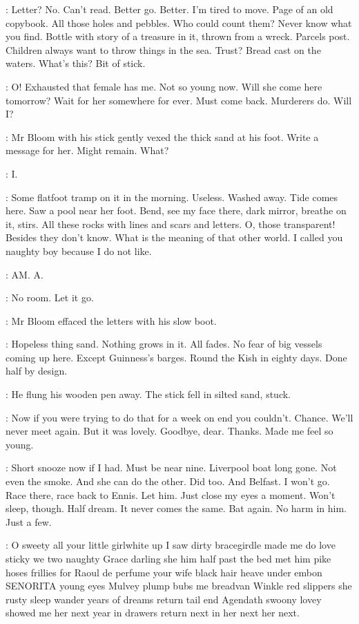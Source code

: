 \Bloom:
Letter? No. Can't read. Better go.
Better. I'm tired to move. Page of an old copybook. All those holes and
pebbles. Who could count them? Never know what you find. Bottle with
story of a treasure in it, thrown from a wreck. Parcels post. Children
always want to throw things in the sea. Trust? Bread cast on the waters.
What's this? Bit of stick.

\Bloom:
O! Exhausted that female has me. Not so young now. Will she come
here tomorrow? Wait for her somewhere for ever. Must come back.
Murderers do. Will I?

:
Mr Bloom with his stick gently vexed the thick sand at his foot. Write
a message for her. Might remain. What?

\Bloom:
I.

\Bloom:
Some flatfoot tramp on it in the morning. Useless. Washed away. Tide comes
here. Saw a pool near her foot. Bend, see my face there, dark mirror,
breathe on it, stirs. All these rocks with lines and scars and letters. O,
those transparent! Besides they don't know. What is the meaning of that
other world. I called you naughty boy because I do not like.

\Bloom:
AM. A.

\Bloom:
No room. Let it go.

:
Mr Bloom effaced the letters with his slow boot.

\Bloom:
Hopeless thing sand.
Nothing grows in it. All fades. No fear of big vessels coming up here.
Except Guinness's barges. Round the Kish in eighty days. Done half by
design.

:
He flung his wooden pen away. The stick fell in silted sand, stuck.

\Bloom:
Now if you were trying to do that for a week on end you couldn't. Chance.
We'll never meet again. But it was lovely. Goodbye, dear. Thanks. Made me
feel so young.

\Bloom:
Short snooze now if I had. Must be near nine. Liverpool boat long
gone. Not even the smoke. And she can do the other. Did too. And Belfast.
I won't go. Race there, race back to Ennis. Let him. Just close my eyes a
moment. Won't sleep, though. Half dream. It never comes the same. Bat
again. No harm in him. Just a few.

\Bloom:
O sweety all your little girlwhite up I saw dirty bracegirdle made me
do love sticky we two naughty Grace darling she him half past the bed met
him pike hoses frillies for Raoul de perfume your wife black hair heave
under embon SENORITA young eyes Mulvey plump bubs me breadvan Winkle
red slippers she rusty sleep wander years of dreams return tail end
Agendath swoony lovey showed me her next year in drawers return next in
her next her next.

